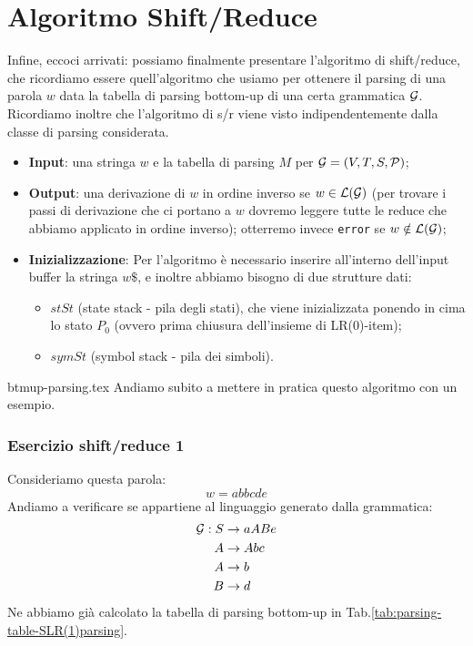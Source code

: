 \documentclass[class=book, crop=false, oneside, 12pt]{standalone}
\begin{document}
\section{Algoritmo Shift/Reduce}
Infine, eccoci arrivati: possiamo finalmente presentare l'algoritmo di shift/reduce, che ricordiamo essere quell'algoritmo che usiamo per ottenere il parsing di una parola \(w\) data la tabella di parsing bottom-up di una certa grammatica \(\mathcal{G}\). Ricordiamo inoltre che l'algoritmo di s/r viene visto indipendentemente dalla classe di parsing considerata.
\begin{itemize}
    \item \textbf{Input}: una stringa \(w\) e la tabella di parsing \(M\) per \(\mathcal{G} = (V, T, S, \mathcal{P})\);
    \item \textbf{Output}: una derivazione di \(w\) in ordine inverso se \(w \in \mathcal{L}(\mathcal{G})\) (per trovare i passi di derivazione che ci portano a \(w\) dovremo leggere tutte le reduce che abbiamo applicato in ordine inverso); otterremo invece \texttt{error} se \(w \notin \mathcal{L}(\mathcal{G})\);
    \item \textbf{Inizializzazione}: Per l'algoritmo è necessario inserire all'interno dell'input buffer la stringa \(w\$\), e inoltre abbiamo bisogno di due strutture dati:
    \begin{itemize}
        \item \(stSt\) (state stack - pila degli stati), che viene inizializzata ponendo in cima lo stato \(P_0\) (ovvero prima chiusura dell'insieme di LR(0)-item);
        \item \(symSt\) (symbol stack - pila dei simboli).
    \end{itemize}
\end{itemize}

{btmup-parsing.tex}
Andiamo subito a mettere in pratica questo algoritmo con un esempio.

\subsubsection{Esercizio shift/reduce 1}
Consideriamo questa parola:
\begin{equation*}
    w = abbcde
\end{equation*}
Andiamo a verificare se appartiene al linguaggio generato dalla grammatica:
\begin{align}
    \label{eq:grammar-ex-sh/re-1}
    \mathcal{G}: S &\to aABe \\
    A &\to Abc \nonumber \\ \notag
    A &\to b \nonumber \\ \notag
    B &\to d  \nonumber \notag
\end{align}
Ne abbiamo già calcolato la tabella di parsing bottom-up in Tab.\ref{tab:parsing-table-SLR(1)parsing}.
\end{document}
